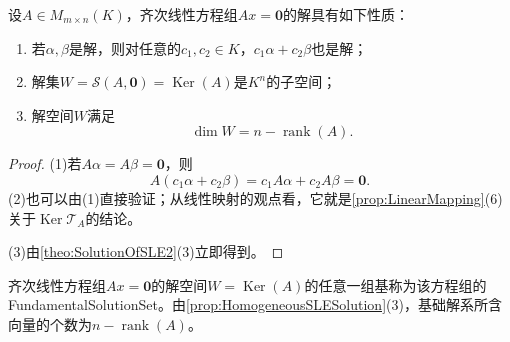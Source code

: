 \begin{property}\label{prop:HomogeneousSLESolution}
	设$A\in M_{m\times n}(K)$，齐次线性方程组$Ax=\mathbf{0}$的解具有如下性质：
	\begin{enumerate}
		\item 若$\alpha,\beta$是解，则对任意的$c_1,c_2\in K$，$c_1\alpha+c_2\beta$也是解；
		\item 解集$W=\mathcal{S}(A,\mathbf{0})=\operatorname{Ker}(A)$是$K^n$的子空间；
		\item 解空间$W$满足
		\begin{equation*}
			\dim W=n-\operatorname{rank}(A).
		\end{equation*}
	\end{enumerate}
\end{property}
\begin{proof}
	(1)若$A\alpha=A\beta=\mathbf{0}$，则
	\begin{equation*}
		A(c_1\alpha+c_2\beta)
		=c_1A\alpha+c_2A\beta
		=\mathbf{0}.
	\end{equation*}
	(2)也可以由(1)直接验证；从线性映射的观点看，它就是\cref{prop:LinearMapping}(6)关于$\operatorname{Ker}\mathcal{T}_A$的结论。\par
	(3)由\cref{theo:SolutionOfSLE2}(3)立即得到。
\end{proof}

\begin{definition}
	齐次线性方程组$Ax=\mathbf{0}$的解空间$W=\operatorname{Ker}(A)$的任意一组基称为该方程组的\gls{FundamentalSolutionSet}。由\cref{prop:HomogeneousSLESolution}(3)，基础解系所含向量的个数为$n-\operatorname{rank}(A)$。
\end{definition}

